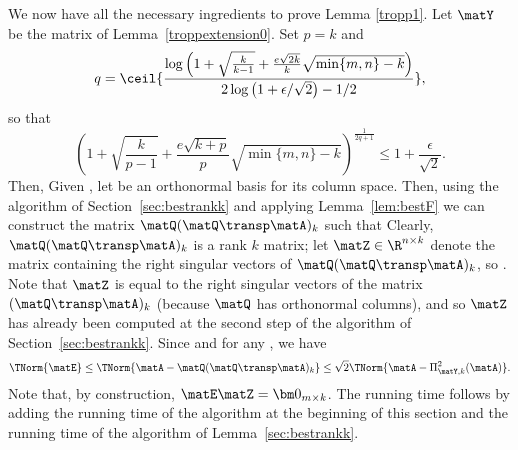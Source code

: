 We now have all the necessary ingredients to prove Lemma \ref{tropp1}. Let $\matY$ be the matrix of Lemma~\ref{troppextension0}. Set
$p = k$ and $$q = \ceil{ \frac{ \log\left( 1+
\sqrt{\frac{k}{k-1}} + \frac{e \sqrt{2k}}{k} \sqrt{ \min\{ m,n\} -k } \right)
}{2 \log\left(1+\epsilon/\sqrt{2}\right)  - 1/2 }},$$
so that
$$ \left(1 + \sqrt{\frac{k}{p-1}} + \frac{e \sqrt{k+p}}{p} \sqrt{ \min\{ m,n\} -k } \right)^{\frac{1}{2q+1}} \leq 1 + \frac{\epsilon}{\sqrt{2}}.$$
Then,
Given \math{\matY}, let \math{\matQ} be an orthonormal basis for its column
space. Then,
using the algorithm of Section~\ref{sec:bestrankk}
and applying Lemma~\ref{lem:bestF} we can construct
the matrix $\matQ(\matQ\transp\matA)_k$ such that
Clearly, $\matQ(\matQ\transp\matA)_k$ is a rank $k$ matrix;
let $\matZ \in {\R}^{n \times k}$ denote the
matrix containing the right singular vectors of
$\matQ(\matQ\transp\matA)_k$, so
.
Note that $\matZ$ is equal to the right singular vectors of the
matrix $(\matQ\transp\matA)_k$
(because $\matQ$ has orthonormal columns), and so $\matZ$
has already been computed at the second step of the
algorithm of Section~\ref{sec:bestrankk}. Since
\math{\matE=\matA - \matA \matZ
\matZ\transp} and
\math{\TNorm{\matA-\matA\matZ\matZ\transp}\le
\TNorm{\matA-\matX\matZ\transp}} for any \math{\matX}, we have
$$\TNorm{\matE} \leq \TNorm{\matA - \matQ(\matQ\transp\matA)_k}
\le\sqrt{2} \TNorm{\matA - \Pi_{\matY,k}^2(\matA) }.$$
Note that, by construction, $\matE\matZ=\bm0_{m\times k}$.
The running time follows by adding the running time of
the algorithm at the beginning of this section and the
 running time of the algorithm of Lemma~\ref{sec:bestrankk}.


